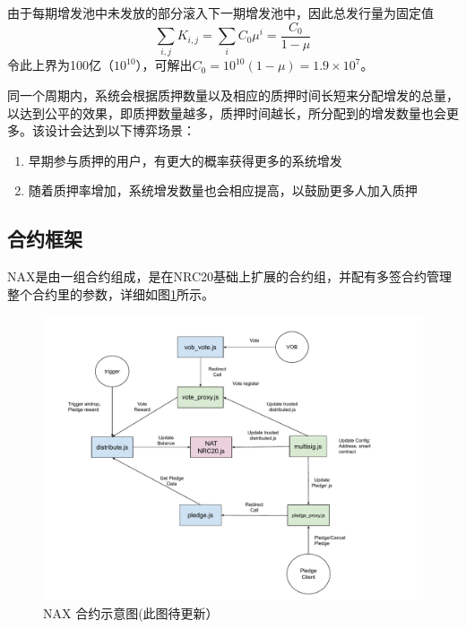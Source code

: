 由于每期增发池中未发放的部分滚入下一期增发池中，因此总发行量为固定值
\begin{equation}
  \sum_{i,j} K_{i,j} = \sum_i C_0 \mu^i = \frac{C_0}{1-\mu}
\end{equation}
令此上界为100亿（\(10^{10}\)），可解出\(C_0 = 10^{10}(1-\mu) = 1.9\times10^7\)。


同一个周期内，系统会根据质押数量以及相应的质押时间长短来分配增发的总量，以达到公平的效果，即质押数量越多，质押时间越长，所分配到的增发数量也会更多。该设计会达到以下博弈场景：
\begin{enumerate}
  \item 早期参与质押的用户，有更大的概率获得更多的系统增发
  \item 随着质押率增加，系统增发数量也会相应提高，以鼓励更多人加入质押
\end{enumerate}

\subsection{合约框架}
NAX是由一组合约组成，是在NRC20基础上扩展的合约组，并配有多签合约管理整个合约里的参数，详细如图\ref{fig:nax_framework}所示。

\begin{figure}[htbp]
  \centering
    \includegraphics[width=1\textwidth]{../common/zh/nax.pdf}
    \caption{NAX 合约示意图(此图待更新） \label{fig:nax_framework}}
\end{figure}

